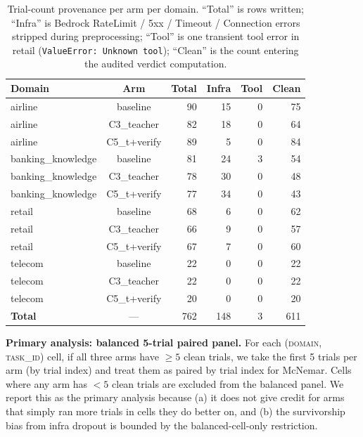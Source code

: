 \begin{table}[!ht]
\centering
\small
\caption{Trial-count provenance per arm per domain. ``Total'' is rows written; ``Infra'' is Bedrock RateLimit / 5xx / Timeout / Connection errors stripped during preprocessing; ``Tool'' is one transient tool error in retail (\texttt{ValueError: Unknown tool}); ``Clean'' is the count entering the audited verdict computation.}
\label{tab:tau3_provenance}
\begin{tabular}{lcrrrr}
\toprule
\textbf{Domain} & \textbf{Arm} & \textbf{Total} & \textbf{Infra} & \textbf{Tool} & \textbf{Clean} \\
\midrule
airline           & baseline       &  90 & 15 & 0 & 75 \\
airline           & C3\_teacher    &  82 & 18 & 0 & 64 \\
airline           & C5\_t+verify   &  89 &  5 & 0 & 84 \\
banking\_knowledge & baseline      &  81 & 24 & 3 & 54 \\
banking\_knowledge & C3\_teacher   &  78 & 30 & 0 & 48 \\
banking\_knowledge & C5\_t+verify  &  77 & 34 & 0 & 43 \\
retail            & baseline       &  68 &  6 & 0 & 62 \\
retail            & C3\_teacher    &  66 &  9 & 0 & 57 \\
retail            & C5\_t+verify   &  67 &  7 & 0 & 60 \\
telecom           & baseline       &  22 &  0 & 0 & 22 \\
telecom           & C3\_teacher    &  22 &  0 & 0 & 22 \\
telecom           & C5\_t+verify   &  20 &  0 & 0 & 20 \\
\midrule
\textbf{Total}    & --- & 762 & 148 & 3 & 611 \\
\bottomrule
\end{tabular}
\end{table}

\textbf{Primary analysis: balanced 5-trial paired panel.} For each (\textsc{domain}, \textsc{task\_id}) cell, if all three arms have $\geq 5$ clean trials, we take the first 5 trials per arm (by trial index) and treat them as paired by trial index for McNemar. Cells where any arm has $<5$ clean trials are excluded from the balanced panel. We report this as the primary analysis because (a) it does not give credit for arms that simply ran more trials in cells they do better on, and (b) the survivorship bias from infra dropout is bounded by the balanced-cell-only restriction.

